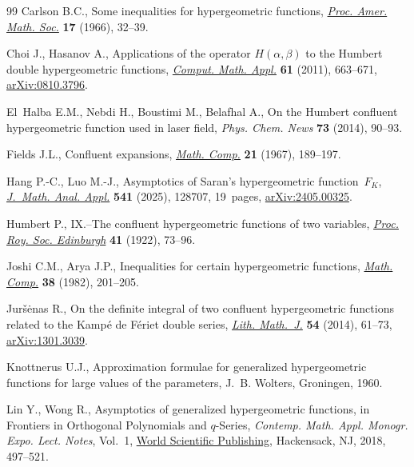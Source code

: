 \documentclass[10pt,a4paper]{amsart}
\numberwithin{equation}{section}
\begin{document}
\begin{thebibliography}{99}
Carlson B.C., Some inequalities for hypergeometric functions, \href{https://doi.org/10.2307/2035056}{\textit{Proc.
 Amer. Math. Soc.}} \textbf{17} (1966), 32--39.

Choi J., Hasanov A., Applications of the operator {$H(\alpha,\beta)$} to the
 {H}umbert double hypergeometric functions, \href{https://doi.org/10.1016/j.camwa.2010.12.012}{\textit{Comput. Math. Appl.}}
 \textbf{61} (2011), 663--671, \href{https://arxiv.org/abs/0810.3796}{arXiv:0810.3796}.

El~Halba E.M., Nebdi H., Boustimi M., Belafhal A., On the {H}umbert confluent
 hypergeometric function used in laser field, \textit{Phys. Chem. News}
 \textbf{73} (2014), 90--93.

Fields J.L., Confluent expansions, \href{https://doi.org/10.2307/2004159}{\textit{Math. Comp.}} \textbf{21} (1967),
 189--197.

Hang P.-C., Luo M.-J., Asymptotics of {S}aran's hypergeometric function~$F_K$,
 \href{https://doi.org/10.1016/j.jmaa.2024.128707}{\textit{J.~Math. Anal. Appl.}} \textbf{541} (2025), 128707, 19~pages,
 \href{https://arxiv.org/abs/2405.00325}{arXiv:2405.00325}.

Humbert P., {IX}.--{T}he confluent hypergeometric functions of two variables,
 \href{https://doi.org/10.1017/S0370164600009810}{\textit{Proc. Roy. Soc. Edinburgh}} \textbf{41} (1922), 73--96.

Joshi C.M., Arya J.P., Inequalities for certain hypergeometric functions,
 \href{https://doi.org/10.2307/2007475}{\textit{Math. Comp.}} \textbf{38} (1982), 201--205.

Jur\v{s}\.enas R., On the definite integral of two confluent hypergeometric
 functions related to the {K}amp\'e de {F}\'eriet double series, \href{https://doi.org/10.1007/s10986-014-9227-y}{\textit{Lith.
 Math.~J.}} \textbf{54} (2014), 61--73, \href{https://arxiv.org/abs/1301.3039}{arXiv:1301.3039}.

Knottnerus U.J., Approximation formulae for generalized hypergeometric
 functions for large values of the parameters, J.~B. Wolters, Groningen, 1960.

Lin Y., Wong R., Asymptotics of generalized hypergeometric functions, in
 Frontiers in Orthogonal Polynomials and {$q$}-Series, \textit{Contemp. Math.
 Appl. Monogr. Expo. Lect. Notes}, Vol.~1, \href{https://doi.org/10.1142/9789813228887_0025}{World Scientific Publishing},
 Hackensack, NJ, 2018, 497--521.


\end{thebibliography}
\end{document}
